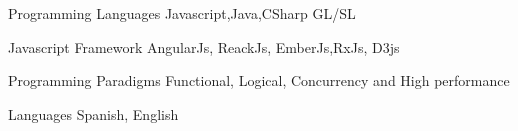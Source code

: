


\begin{cvskills}


\cvskill
{Programming Languages} %
{Javascript,Java,CSharp GL/SL} %



\cvskill
{Javascript Framework} %
{AngularJs, ReackJs, EmberJs,RxJs, D3js} %



\cvskill
{Programming Paradigms} %
{Functional, Logical, Concurrency and High performance} %


\cvskill
{Languages} %
{Spanish, English} %




\end{cvskills}

